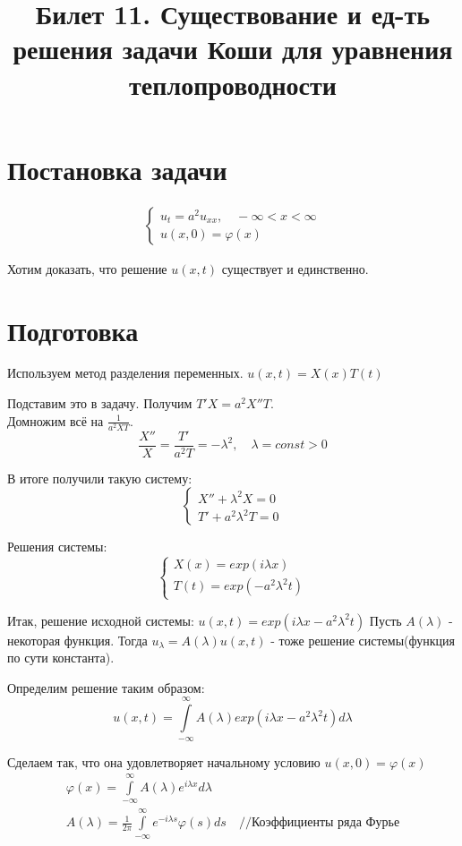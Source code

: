 \documentclass[11pt,a4paper, fqlen]{article}
\title{Билет 11. Существование и ед-ть решения задачи Коши для уравнения теплопроводности}
\date{}
\begin{document}
	\maketitle
	
	\section{Постановка задачи}
	\begin{gather}
	\begin{cases}
		u_t = a^2 u_{xx}, \quad -\infty < x < \infty\\
		u(x,0) = \varphi(x)
	\end{cases}
	\end{gather}

Хотим доказать, что решение $u(x,t)$ существует и единственно.

\section{Подготовка}

	Используем метод разделения переменных. $u(x,t) = X(x)T(t)$
	
	Подставим это в задачу. Получим $T'X = a^2X''T$. \\
	Домножим всё на $\frac{1}{a^2XT}$.
	 $$\frac{X''}{X} = \frac{T'}{a^2 T} = -\lambda^2, \quad \lambda = const > 0$$
	 
	В итоге получили такую систему:
	$$
	\begin{cases}
	X'' + \lambda^2X = 0 \\
	T' + a^2\lambda^2T = 0
	\end{cases}
	$$

	Решения системы: 
	\[
	\begin{cases}
	X(x) = exp(i \lambda x)\\
	T(t) = exp(-a^2 \lambda^2 t)
	\end{cases}
	\]

	Итак, решение исходной системы: $u(x,t) = exp(i \lambda x - a^2 \lambda^2 t)$
	Пусть $A(\lambda)$ - некоторая функция. Тогда $u_\lambda = A(\lambda)  u(x,t)$ - тоже решение системы(функция по сути константа).
		
	Определим решение таким образом:
	\[
	u(x,t) = \int \limits_{-\infty}^{\infty} A(\lambda) exp(i \lambda x - a^2 \lambda^2 t) d\lambda
	\]
	
	Сделаем так, что она удовлетворяет начальному условию $u(x,0) = \varphi(x)$
	\begin{gather}
	\varphi (x) = \int \limits_{-\infty}^{\infty} A(\lambda) e^{i\lambda x} d\lambda \\	
	A(\lambda) = \frac{1}{2\pi}  \int \limits_{-\infty}^{\infty} e^{-i \lambda s} \varphi(s) ds \quad \text{//Коэффициенты ряда Фурье}
	\end{gather}
	
\end{document}

